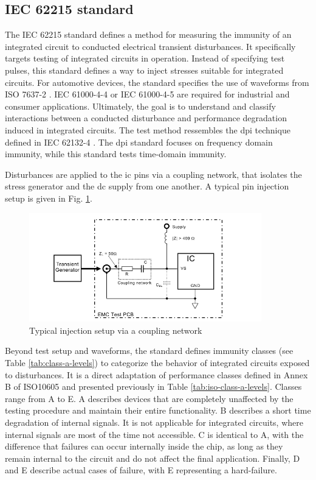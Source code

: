 \subsection{IEC 62215 standard}

The IEC 62215 standard \cite{iec62215} defines a method for measuring the immunity of an integrated circuit to conducted electrical transient disturbances.
It specifically targets testing of integrated circuits in operation.
Instead of specifying test pulses, this standard defines a way to inject stresses suitable for integrated circuits.
For automotive devices, the standard specifies the use of waveforms from ISO 7637-2 \cite{iso7637-2}.
IEC 61000-4-4 \cite{iec61000-4-4} or IEC 61000-4-5 are required for industrial and consumer applications.
Ultimately, the goal is to understand and classify interactions between a conducted disturbance and performance degradation induced in integrated circuits.
The test method ressembles the \gls{dpi} technique defined in IEC 62132-4 \cite{iec62132-4}.
The \gls{dpi} standard focuses on frequency domain immunity, while this standard tests time-domain immunity.

Disturbances are applied to the \gls{ic} pins via a coupling network, that isolates the stress generator and the \gls{dc} supply from one another.
A typical pin injection setup is given in Fig. \ref{fig:iec62215_setup}.

\begin{figure}[!h]
  \centering
  \includegraphics[width=0.9\textwidth]{src/1/figures/iec62215_setup.png}
  \caption{Typical injection setup via a coupling network}
  \label{fig:iec62215_setup}
\end{figure}

Beyond test setup and waveforms, the standard defines immunity classes (see Table \ref{tab:class-a-levels}) to categorize the behavior of integrated circuits exposed to disturbances.
It is a direct adaptation of performance classes defined in Annex B of ISO10605 and presented previously in Table \ref{tab:iso-class-a-levels}.
Classes range from A to E.
A describes devices that are completely unaffected by the testing procedure and maintain their entire functionality.
B describes a short time degradation of internal signals. It is not applicable for integrated circuits, where internal signals are most of the time not accessible.
C is identical to A, with the difference that failures can occur internally inside the chip, as long as they remain internal to the circuit and do not affect the final application.
Finally, D and E describe actual cases of failure, with E representing a hard-failure.

